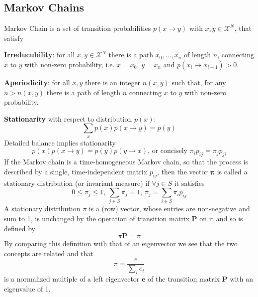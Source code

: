 \documentclass[12pt]{article}
\begin{document}
\subsection{Markov Chains}
Markov Chain is a set of transition probabilities $p(x\rightarrow y)$ with $x, y \in \mathcal{X}^N$, that satisfy
\olb
\item \textbf{Irreducubility}: for all $x, y \in \mathcal{X}^N$ there is a path $x_0, \dots , x_n$ of length $n$, connecting $x$ to $y$ with non-zero probability, i.e. $x = x_0$, $y = x_n$ and $p(x_i \rightarrow x_{i+1}) > 0$.
\item \textbf{Aperiodicity}: for all $x, y$ there is an integer $n(x, y)$ such that, for any $n > n(x, y)$ there is a path of length $n$ connecting $x$ to $y$ with non-zero probability.
\item \textbf{Stationarity} with respect to distribution $p(x)$:
\[ \sum_x p(x)p(x\rightarrow y) = p(y) \]
\ole
Detailed balance implies stationarity
\[ p(x)p(x\rightarrow y) = p(y)p(y\rightarrow x) \text{, or concisely } \pi_i p_{ij} = \pi_j p_{ji} \]
If the Markov chain is a time-homogeneous Markov chain, so that the process is described by a single, time-independent matrix $p_{ij}$, then the vector $\mathbf{\pi}$ is called a stationary distribution (or invariant measure) if $\forall j\in S$ it satisfies
\[ 0\leq \pi_j \leq 1 \text{, } \sum_{j\in S}\pi_j = 1 \text{, } \pi_j = \sum_{i\in S} \pi_i p_{ij} \]
A stationary distribution $\pi$ is a (row) vector, whose entries are non-negative and sum to 1, is unchanged by the operation of transition matrix $\mathbf{P}$ on it and so is defined by
\[ \pi \mathbf{P} = \pi \]
By comparing this definition with that of an eigenvector we see that the two concepts are related and that
\[ \pi = \frac{e}{\sum_i e_i} \]
is a normalized multiple of a left eigenvector $\mathbf{e}$ of the transition matrix $\mathbf{P}$ with an eigenvalue of 1.
\end{document}
